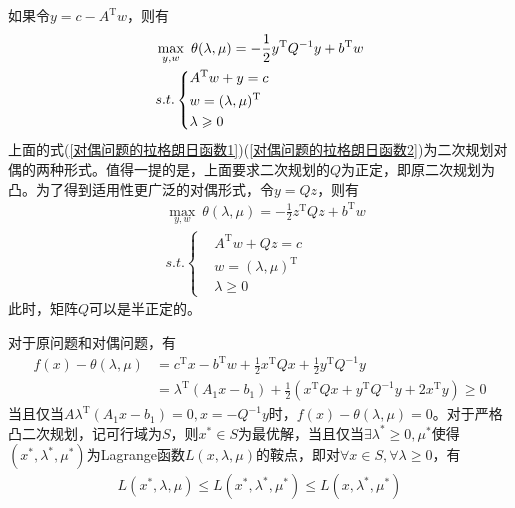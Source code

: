         \par
        如果令$y=c-A^\mathrm{T} w$，则有
        \begin{align}
          \label{对偶问题的拉格朗日函数2}
          & \mathop{\max}\limits_{y,w}\  \theta(\lambda,\mu)=-\frac 12y^\mathrm{T} Q^{-1}y+b^\mathrm{T} w\\
          & s.t.\left\{
            \begin{aligned}
                &A^\mathrm{T} w+y=c\\
                &w=(\lambda,\mu)^\mathrm{T} \\
                &\lambda \geqslant 0
            \end{aligned}
          \right.\notag
        \end{align}
        上面的式(\ref{对偶问题的拉格朗日函数1})(\ref{对偶问题的拉格朗日函数2})为二次规划对偶的两种形式。值得一提的是，上面要求二次规划的$Q$为正定，即原二次规划为凸。为了得到适用性更广泛的对偶形式，令$y=Qz$，则有
        \begin{align*}
          & \mathop{\max}\limits_{y,w}\ \theta(\lambda,\mu)=-\frac 12z^\mathrm{T} Qz+b^\mathrm{T} w\\
          & s.t.\left\{
            \begin{aligned}
                &A^\mathrm{T} w+Qz=c\\
                &w=(\lambda,\mu)^\mathrm{T} \\
                &\lambda \geqslant 0
            \end{aligned}
          \right.
        \end{align*}
        此时，矩阵$Q$可以是半正定的。
        \par
        对于原问题和对偶问题，有
        \begin{align*}
        f(x)-\theta(\lambda,\mu)&=c^\mathrm{T} x-b^\mathrm{T} w+\frac{1}{2}x^\mathrm{T} Qx+\frac{1}{2}y^\mathrm{T} Q^{-1}y\\
        &={\lambda}^\mathrm{T} (A_1x-b_1)+\frac{1}{2}(x^\mathrm{T} Qx+y^\mathrm{T} Q^{-1}y+2x^\mathrm{T} y) \geqslant 0
        \end{align*}
        当且仅当$A{\lambda}^\mathrm{T} (A_1x-b_1)=0,x=-Q^{-1}y$时，$f(x)-\theta(\lambda,\mu)=0$。对于严格凸二次规划，记可行域为$S$，则$x^* \in S$为最优解，当且仅当$\exists {\lambda}^* \geqslant 0,{\mu}^*$使得$(x^*,{\lambda}^*,{\mu}^*)$为Lagrange函数$L(x,\lambda,\mu)$的鞍点，即对$\forall x \in S,\forall \lambda \geqslant 0$，有
        \begin{align*}
        L(x^*,{\lambda},{\mu}) \leqslant L(x^*,{\lambda}^*,{\mu}^*) \leqslant L(x,{\lambda}^*,{\mu}^*)
        \end{align*}
